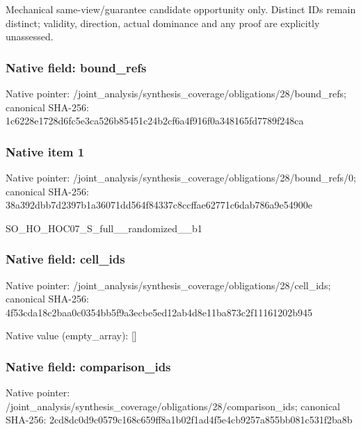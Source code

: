 \documentclass[10pt,a4paper]{article}
\begin{document}
\begingroup\raggedright\sloppy Mechanical same-view/\allowbreak{}guarantee candidate opportunity only. Distinct IDs remain distinct;\allowbreak{} validity,\allowbreak{} direction,\allowbreak{} actual dominance and any proof are explicitly unassessed.\par\endgroup

\subsubsection{Native field: bound\_\allowbreak{}refs}
Native pointer: /joint\_\allowbreak{}analysis/synthesis\_\allowbreak{}coverage/obligations/28/bound\_\allowbreak{}refs; canonical SHA-256: 1c6228e1728d6fc5e3ca526b85451c24b2cf6a4f916f0a348165fd7789f248ca

\subsubsection{Native item 1}
Native pointer: /joint\_\allowbreak{}analysis/synthesis\_\allowbreak{}coverage/obligations/28/bound\_\allowbreak{}refs/0; canonical SHA-256: 38a392dbb7d2397b1a36071dd564f84337c8ccffae62771c6dab786a9e54900e

\begingroup\raggedright\sloppy SO\_\allowbreak{}HO\_\allowbreak{}HOC07\_\allowbreak{}S\_\allowbreak{}full\_\allowbreak{}\_\allowbreak{}randomized\_\allowbreak{}\_\allowbreak{}b1\par\endgroup

\subsubsection{Native field: cell\_\allowbreak{}ids}
Native pointer: /joint\_\allowbreak{}analysis/synthesis\_\allowbreak{}coverage/obligations/28/cell\_\allowbreak{}ids; canonical SHA-256: 4f53cda18c2baa0c0354bb5f9a3ecbe5ed12ab4d8e11ba873c2f11161202b945

Native value (empty\_\allowbreak{}array): []

\subsubsection{Native field: comparison\_\allowbreak{}ids}
Native pointer: /joint\_\allowbreak{}analysis/synthesis\_\allowbreak{}coverage/obligations/28/comparison\_\allowbreak{}ids; canonical SHA-256: 2cd8dc0d9c0579c168c659ff8a1b02f1ad4f5e4cb9257a855bb081c531f2ba8b
\end{document}
